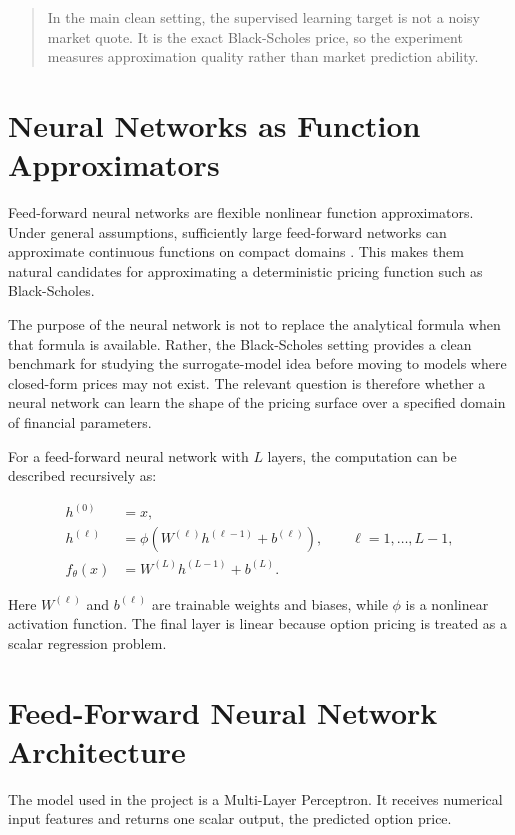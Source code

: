 \begin{quote}
    In the main clean setting, the supervised learning target is not a noisy market quote.
    It is the exact Black-Scholes price, so the experiment measures approximation quality rather than market prediction ability.
\end{quote}

\section{Neural Networks as Function Approximators}

Feed-forward neural networks are flexible nonlinear function approximators.
Under general assumptions, sufficiently large feed-forward networks can approximate continuous functions on compact domains \cite{cybenko1989approximation,hornik1989multilayer}.
This makes them natural candidates for approximating a deterministic pricing function such as Black-Scholes.

The purpose of the neural network is not to replace the analytical formula when that formula is available.
Rather, the Black-Scholes setting provides a clean benchmark for studying the surrogate-model idea before moving to models where closed-form prices may not exist.
The relevant question is therefore whether a neural network can learn the shape of the pricing surface over a specified domain of financial parameters.

For a feed-forward neural network with $L$ layers, the computation can be described recursively as:

\begin{align}
    h^{(0)} &= x, \\
    h^{(\ell)} &= \phi\left(W^{(\ell)}h^{(\ell-1)} + b^{(\ell)}\right),
    \qquad \ell = 1,\dots,L-1, \\
    f_\theta(x) &= W^{(L)}h^{(L-1)} + b^{(L)}.
\end{align}

Here $W^{(\ell)}$ and $b^{(\ell)}$ are trainable weights and biases, while $\phi$ is a nonlinear activation function.
The final layer is linear because option pricing is treated as a scalar regression problem.

\section{Feed-Forward Neural Network Architecture}

The model used in the project is a Multi-Layer Perceptron.
It receives numerical input features and returns one scalar output, the predicted option price.

